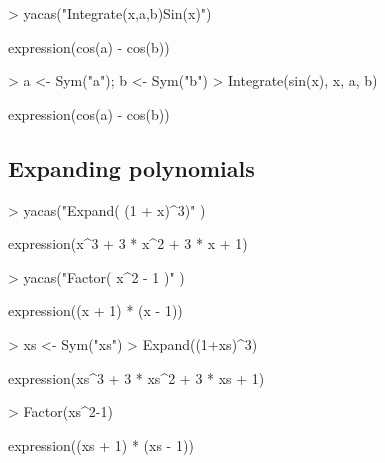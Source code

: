 \documentclass[10pt]{article}
\begin{document}

\begin{Schunk}
\begin{Sinput}
> yacas("Integrate(x,a,b)Sin(x)")
\end{Sinput}
\begin{Soutput}
expression(cos(a) - cos(b))
\end{Soutput}
\end{Schunk}

\begin{Schunk}
\begin{Sinput}
> a <- Sym("a"); b <- Sym("b")
> Integrate(sin(x), x, a, b)
\end{Sinput}
\begin{Soutput}
expression(cos(a) - cos(b))
\end{Soutput}
\end{Schunk}



\subsection{Expanding polynomials}

\begin{Schunk}
\begin{Sinput}
> yacas("Expand( (1 + x)^3)" )
\end{Sinput}
\begin{Soutput}
expression(x^3 + 3 * x^2 + 3 * x + 1)
\end{Soutput}
\begin{Sinput}
> yacas("Factor( x^2 - 1 )" )
\end{Sinput}
\begin{Soutput}
expression((x + 1) * (x - 1))
\end{Soutput}
\end{Schunk}
\begin{Schunk}
\begin{Sinput}
> xs <- Sym("xs")
> Expand((1+xs)^3)
\end{Sinput}
\begin{Soutput}
expression(xs^3 + 3 * xs^2 + 3 * xs + 1)
\end{Soutput}
\begin{Sinput}
> Factor(xs^2-1)
\end{Sinput}
\begin{Soutput}
expression((xs + 1) * (xs - 1))
\end{Soutput}
\end{Schunk}
\end{document}
